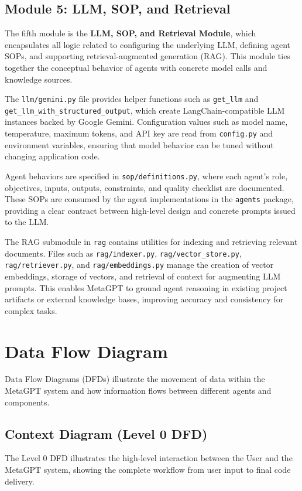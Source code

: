 \subsection{Module 5: LLM, SOP, and Retrieval}

The fifth module is the \textbf{LLM, SOP, and Retrieval Module}, which encapsulates all logic related to configuring the underlying LLM, defining agent SOPs, and supporting retrieval-augmented generation (RAG). This module ties together the conceptual behavior of agents with concrete model calls and knowledge sources.

The \texttt{llm/gemini.py} file provides helper functions such as \texttt{get\_llm} and \texttt{get\_llm\_with\_structured\_output}, which create LangChain-compatible LLM instances backed by Google Gemini. Configuration values such as model name, temperature, maximum tokens, and API key are read from \texttt{config.py} and environment variables, ensuring that model behavior can be tuned without changing application code.

Agent behaviors are specified in \texttt{sop/definitions.py}, where each agent’s role, objectives, inputs, outputs, constraints, and quality checklist are documented. These SOPs are consumed by the agent implementations in the \texttt{agents} package, providing a clear contract between high-level design and concrete prompts issued to the LLM.

The RAG submodule in \texttt{rag} contains utilities for indexing and retrieving relevant documents. Files such as \texttt{rag/indexer.py}, \texttt{rag/vector\_store.py}, \texttt{rag/retriever.py}, and \texttt{rag/embeddings.py} manage the creation of vector embeddings, storage of vectors, and retrieval of context for augmenting LLM prompts. This enables MetaGPT to ground agent reasoning in existing project artifacts or external knowledge bases, improving accuracy and consistency for complex tasks.

\section{Data Flow Diagram}

Data Flow Diagrams (DFDs) illustrate the movement of data within the MetaGPT system and how information flows between different agents and components.

\subsection{Context Diagram (Level 0 DFD)}
The Level 0 DFD illustrates the high-level interaction between the User and the MetaGPT system, showing the complete workflow from user input to final code delivery.


